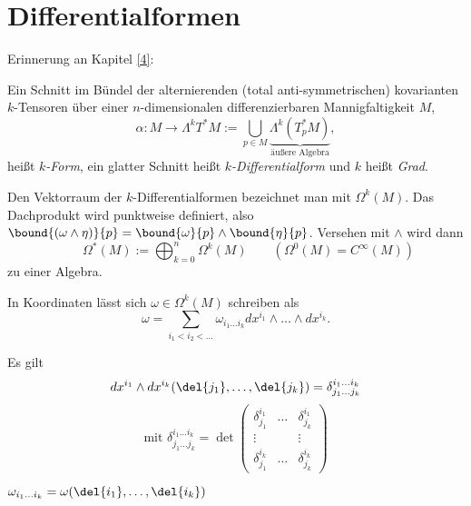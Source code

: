 \chapter{Differentialformen}\lecture

Erinnerung an Kapitel \ref{4}:

\begin{defn*}
	Ein Schnitt im Bündel der alternierenden (total anti-symmetrischen) kovarianten $k$-Tensoren über einer $n$-dimensionalen differenzierbaren Mannigfaltigkeit $M$,
	\[ \alpha: M \to \Lambda^k T^*M := \bigcup_{p \in M} \underbrace{\Lambda^k(T_p^*M)}_{\text{äußere Algebra}}, \]
	heißt \emph{$k$-Form}, ein glatter Schnitt heißt \emph{$k$-Differentialform} und $k$ heißt \emph{Grad}.
\end{defn*}

Den Vektorraum der $k$-Differentialformen bezeichnet man mit $\Omega^k(M)$. Das Dachprodukt wird punktweise definiert, also $ \bound{(\omega \wedge \eta)}{p} = \bound{\omega}{p} \wedge \bound{\eta}{p} $. Versehen mit $\wedge$ wird dann
	\[ \qquad \Omega^*(M) := \bigoplus_{k=0}^n \Omega^k(M) \qquad (\Omega^0(M) = C^\infty(M)) \]
zu einer Algebra.

\begin{rem*}
	In Koordinaten lässt sich $\omega \in \Omega^k(M)$ schreiben als
	\[ \omega = \sum_{i_1 < i_2 < \dots} \omega_{i_1\dots i_k} dx^{i_1} \wedge \dots \wedge dx^{i_k}. \]
\end{rem*}

\begin{lem}
	Es gilt
	\[ dx^{i_1} \wedge dx^{i_k} (\del{j_1}, \dotsc, \del{j_k}) = \delta_{j_1\dots j_k}^{i_1 \dots i_k} \]
	\[ \text{mit } \delta_{j_1\dots j_k}^{i_1 \dots i_k} = \det \begin{pmatrix}
		\delta_{j_1}^{i_1} & \dots & \delta_{j_k}^{i_1}\\
		\vdots & & \vdots\\
		\delta_{j_1}^{i_k} & \dots & \delta_{j_k}^{i_k}
	\end{pmatrix} \]
\end{lem}

\begin{cor*}
	$ \omega_{i_1 \dots i_k} = \omega(\del{i_1}, \dotsc, \del{i_k}) $
\end{cor*}

